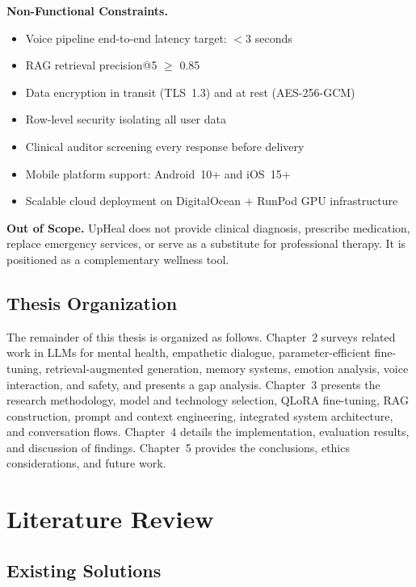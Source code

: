 \documentclass[12pt,a4paper,oneside,openany]{report}
\begin{document}
\textbf{Non-Functional Constraints.}
\begin{itemize}[nosep]
\item Voice pipeline end-to-end latency target: $<$3 seconds
\item RAG retrieval precision@5 $\geq$ 0.85
\item Data encryption in transit (TLS~1.3) and at rest (AES-256-GCM)
\item Row-level security isolating all user data
\item Clinical auditor screening every response before delivery
\item Mobile platform support: Android~10+ and iOS~15+
\item Scalable cloud deployment on DigitalOcean + RunPod GPU infrastructure
\end{itemize}

\textbf{Out of Scope.} UpHeal does not provide clinical diagnosis, prescribe medication, replace emergency services, or serve as a substitute for professional therapy. It is positioned as a complementary wellness tool.

\section{Thesis Organization}
\label{sec:org}

The remainder of this thesis is organized as follows. Chapter~2 surveys related work in LLMs for mental health, empathetic dialogue, parameter-efficient fine-tuning, retrieval-augmented generation, memory systems, emotion analysis, voice interaction, and safety, and presents a gap analysis. Chapter~3 presents the research methodology, model and technology selection, QLoRA fine-tuning, RAG construction, prompt and context engineering, integrated system architecture, and conversation flows. Chapter~4 details the implementation, evaluation results, and discussion of findings. Chapter~5 provides the conclusions, ethics considerations, and future work.

\chapter{Literature Review}
\label{ch:litreview}

\section{Existing Solutions}
\end{document}

